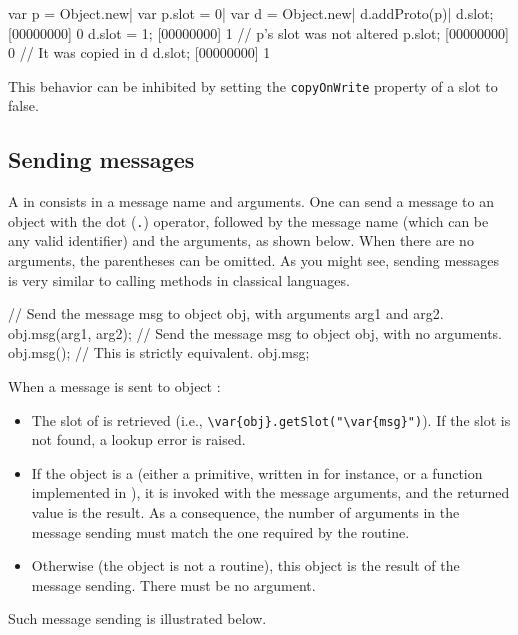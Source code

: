 \begin{urbiscript}
var p = Object.new|
var p.slot = 0|
var d = Object.new|
d.addProto(p)|
d.slot;
[00000000] 0
d.slot = 1;
[00000000] 1
// p's slot was not altered
p.slot;
[00000000] 0
// It was copied in d
d.slot;
[00000000] 1
\end{urbiscript}

This behavior can be inhibited by setting the \lstinline|copyOnWrite| property
of a slot to false.


\subsection{Sending messages}

A  in \us consists in a message name and arguments. One can
send a message to an object with the dot (\lstinline|.|) operator, followed
by the message name (which can be any valid identifier) and the arguments,
as shown below. When there are no arguments, the parentheses can be
omitted. As you might see, sending messages is very similar to calling
methods in classical languages.

\begin{urbiunchecked}
// Send the message msg to object obj, with arguments arg1 and arg2.
obj.msg(arg1, arg2);
// Send the message msg to object obj, with no arguments.
obj.msg();
// This is strictly equivalent.
obj.msg;
\end{urbiunchecked}

When a message  is sent to object :

\begin{itemize}
\item The  slot of  is retrieved (i.e.,
  \lstinline[style=varInString]|\var{obj}.getSlot("\var{msg}")|). If the
  slot is not found, a lookup error is raised.
\item If the object is a  (either a primitive, written in \Cxx
  for instance, or a function implemented in \us), it is invoked with the
  message arguments, and the returned value is the result. As a consequence,
  the number of arguments in the message sending must match the one required
  by the routine.
\item Otherwise (the object is not a routine), this object is the result of
  the message sending. There must be no argument.
\end{itemize}

Such message sending is illustrated below.

